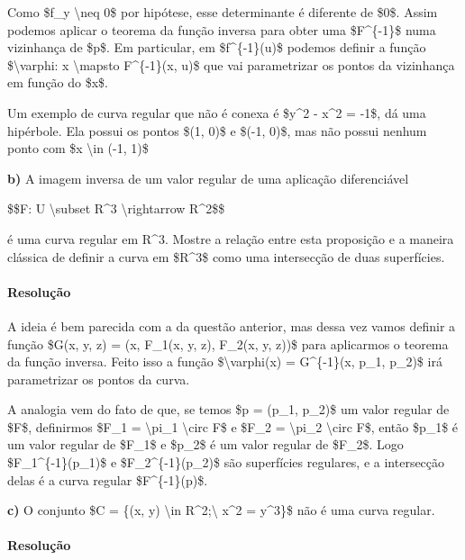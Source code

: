 Como \$f\_y \textbackslash{}neq 0\$ por hipótese, esse determinante é
diferente de \$0\$. Assim podemos aplicar o teorema da função inversa
para obter uma \$F\^{}\{-1\}\$ numa vizinhança de \$p\$. Em particular,
em \$f\^{}\{-1\}(u)\$ podemos definir a função \$\textbackslash{}varphi:
x \textbackslash{}mapsto F\^{}\{-1\}(x, u)\$ que vai parametrizar os
pontos da vizinhança em função do \$x\$.

Um exemplo de curva regular que não é conexa é \$y\^{}2 - x\^{}2 = -1\$,
dá uma hipérbole. Ela possui os pontos \$(1, 0)\$ e \$(-1, 0)\$, mas não
possui nenhum ponto com \$x \textbackslash{}in (-1, 1)\$

\textbf{b)} A imagem inversa de um valor regular de uma aplicação
diferenciável

\$\$F: U \textbackslash{}subset R\^{}3 \textbackslash{}rightarrow
R\^{}2\$\$

é uma curva regular em R\^{}3. Mostre a relação entre esta proposição e
a maneira clássica de definir a curva em \$R\^{}3\$ como uma intersecção
de duas superfícies.

\hypertarget{resoluuxe7uxe3o-11}{%
\paragraph{Resolução}\label{resoluuxe7uxe3o-11}}

A ideia é bem parecida com a da questão anterior, mas dessa vez vamos
definir a função \$G(x, y, z) = (x, F\_1(x, y, z), F\_2(x, y, z))\$ para
aplicarmos o teorema da função inversa. Feito isso a função
\$\textbackslash{}varphi(x) = G\^{}\{-1\}(x, p\_1, p\_2)\$ irá
parametrizar os pontos da curva.

A analogia vem do fato de que, se temos \$p = (p\_1, p\_2)\$ um valor
regular de \$F\$, definirmos \$F\_1 = \textbackslash{}pi\_1
\textbackslash{}circ F\$ e \$F\_2 = \textbackslash{}pi\_2
\textbackslash{}circ F\$, então \$p\_1\$ é um valor regular de \$F\_1\$
e \$p\_2\$ é um valor regular de \$F\_2\$. Logo \$F\_1\^{}\{-1\}(p\_1)\$
e \$F\_2\^{}\{-1\}(p\_2)\$ são superfícies regulares, e a intersecção
delas é a curva regular \$F\^{}\{-1\}(p)\$.

\textbf{c)} O conjunto \$C = \{(x, y) \textbackslash{}in
R\^{}2;\textbackslash{} x\^{}2 = y\^{}3\}\$ não é uma curva regular.

\hypertarget{resoluuxe7uxe3o-12}{%
\paragraph{Resolução}\label{resoluuxe7uxe3o-12}}

